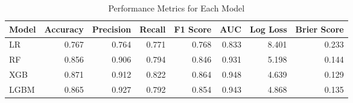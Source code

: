 \begin{table}[H]\centering
\caption{Performance Metrics for Each Model}
\label{Table 3 :performance_metrics}
\begin{tabular}{lrrrrrrr}
\toprule
Model & Accuracy & Precision & Recall & F1 Score & AUC & Log Loss & Brier Score \\
\midrule
LR & 0.767 & 0.764 & 0.771 & 0.768 & 0.833 & 8.401 & 0.233 \\
RF & 0.856 & 0.906 & 0.794 & 0.846 & 0.931 & 5.198 & 0.144 \\
XGB & 0.871 & 0.912 & 0.822 & 0.864 & 0.948 & 4.639 & 0.129 \\
LGBM & 0.865 & 0.927 & 0.792 & 0.854 & 0.943 & 4.868 & 0.135 \\
\bottomrule
\end{tabular}
\end{table}
